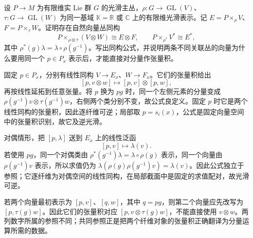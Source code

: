 \begin{exercise}\label{g1:ex:associated-tensor-operations}
	设 \(P\to M\) 为有限维实 Lie 群 \(G\) 的光滑主丛，\(\rho:G\to\operatorname{GL}(V)\)、\(\tau:G\to\operatorname{GL}(W)\) 为同一基域 \(\mathbb K=\mathbb R\) 或 \(\mathbb C\) 上的有限维光滑表示。记 \(E=P\times_\rho V\)、\(F=P\times_\tau W\)。证明存在自然向量丛同构
	\[
		P\times_{\rho\otimes\tau}(V\otimes W)\cong E\otimes F,
		\qquad P\times_{\rho^*}V^*\cong E^*,
	\]
	其中 \(\rho^*(g)\lambda=\lambda\circ\rho(g^{-1})\)。写出同构公式，并说明两条不同关联丛的向量为什么要用同一个 \(p\in P_x\) 表示后，才能直接对分量作张量积。
\end{exercise}
\begin{solution}
	固定 \(p\in P_x\)，分别有线性同构 \(V\to E_x\)、\(W\to F_x\)。它们的张量积给出
	\[
		[p,v\otimes w]\longmapsto[p,v]\otimes[p,w],
	\]
	再按线性延拓到任意张量。将 \(p\) 换为 \(pg\) 时，同一个左侧元素的分量变成 \(\rho(g^{-1})v\otimes\tau(g^{-1})w\)，右侧两个类分别不变，故公式良定义。固定 \(p\) 时它是两个线性同构的张量积，因此逐纤维可逆；局部取 \(p=s_i(x)\)，公式是固定向量空间中的张量积识别，故它及逆光滑。

	对偶情形，把 \([p,\lambda]\) 送到 \(E_x\) 上的线性泛函
	\[
		[p,v]\longmapsto\lambda(v).
	\]
	若使用 \(pg\)，同一个对偶类由 \(\rho^*(g^{-1})\lambda=\lambda\circ\rho(g)\) 表示，同一个向量由 \(\rho(g^{-1})v\) 表示，所以求值仍为 \(\lambda(\rho(g)\rho(g^{-1})v)=\lambda(v)\)。因此公式独立于参照；它逐纤维为对偶空间的线性同构，在局部截面中是固定的求值配对，故光滑可逆。

	若两个向量最初表示为 \([p,v]\)、\([q,w]\)，其中 \(q=pg\)，则第二个向量应先改写为 \([p,\tau(g)w]\)。因此它们的张量积对应 \([p,v\otimes\tau(g)w]\)，不能直接使用 \(v\otimes w\)。两列数字所属的参照不同；共同参照正是把两个纤维对象的张量积正确翻译为分量运算所需的数据。
\end{solution}

